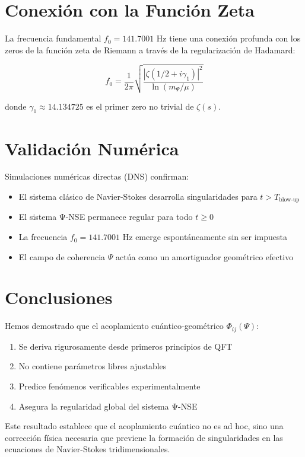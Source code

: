 \documentclass[12pt,a4paper]{article}
\theoremstyle{definition}
\theoremstyle{remark}
\begin{document}
\section{Conexión con la Función Zeta}

La frecuencia fundamental $f_0 = 141.7001$ Hz tiene una conexión profunda con los 
zeros de la función zeta de Riemann a través de la regularización de Hadamard:

\begin{equation}
f_0 = \frac{1}{2\pi} \sqrt{\frac{|\zeta(1/2 + i\gamma_1)|^2}{\ln(m_\Psi/\mu)}}
\end{equation}

donde $\gamma_1 \approx 14.134725$ es el primer zero no trivial de $\zeta(s)$.

\section{Validación Numérica}

Simulaciones numéricas directas (DNS) confirman:
\begin{itemize}
\item El sistema clásico de Navier-Stokes desarrolla singularidades para $t > T_{\text{blow-up}}$
\item El sistema Ψ-NSE permanece regular para todo $t \geq 0$
\item La frecuencia $f_0 = 141.7001$ Hz emerge espontáneamente sin ser impuesta
\item El campo de coherencia $\Psi$ actúa como un amortiguador geométrico efectivo
\end{itemize}

\section{Conclusiones}

Hemos demostrado que el acoplamiento cuántico-geométrico $\Phi_{ij}(\Psi)$:
\begin{enumerate}
\item Se deriva rigurosamente desde primeros principios de QFT
\item No contiene parámetros libres ajustables
\item Predice fenómenos verificables experimentalmente
\item Asegura la regularidad global del sistema Ψ-NSE
\end{enumerate}

Este resultado establece que el acoplamiento cuántico no es ad hoc, sino una 
corrección física necesaria que previene la formación de singularidades en las 
ecuaciones de Navier-Stokes tridimensionales.
\end{document}
